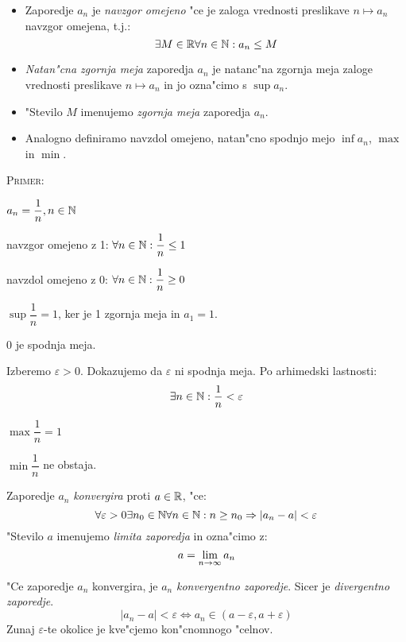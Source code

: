 \begin{itemize}
	\item Zaporedje $a_n$ je \emph{navzgor omejeno} "ce je zaloga vrednosti preslikave $n \mapsto a_n$ navzgor omejena, t.j.:
	\begin{equation*}
	\exists M \in \mathbb{R} \forall n \in \mathbb{N}: a_n \leq M
	\end{equation*}
	
	\item \emph{Natan"cna zgornja meja} zaporedja $a_n$ je natanc"na zgornja meja zaloge vrednosti preslikave $n \mapsto a_n$ in jo ozna"cimo s $\sup a_n$.
	
	\item "Stevilo $M$ imenujemo \emph{zgornja meja} zaporedja $a_n$.
	
	\item Analogno definiramo navzdol omejeno, natan"cno spodnjo mejo $\inf a_n$, $\max$ in $\min$.
\end{itemize}

\textsc{Primer:}

$a_n = \dfrac{1}{n}, n \in \mathbb{N}$
	
navzgor omejeno z 1: $\forall n \in \mathbb{N}: \dfrac{1}{n} \leq 1$
	
navzdol omejeno z 0: $\forall n \in \mathbb{N}: \dfrac{1}{n} \geq 0$
	
$\sup \dfrac{1}{n} = 1$, ker je 1 zgornja meja in $a_1 = 1$.
	
0 je spodnja meja.

Izberemo $\varepsilon > 0$. Dokazujemo da $\varepsilon$ ni spodnja meja. Po arhimedski lastnosti:
\begin{equation*}
\exists n \in \mathbb{N}: \dfrac{1}{n} < \varepsilon
\end{equation*}
	
$\max \dfrac{1}{n} = 1$
	
$\min \dfrac{1}{n}$ ne obstaja.

 Zaporedje $a_n$ \emph{konvergira} proti $a \in \mathbb{R}$, "ce:
\begin{equation*}
\forall \varepsilon > 0 \exists n_0 \in \mathbb{N} \forall n \in \mathbb{N}: n \geq n_0 \Rightarrow |a_n - a| < \varepsilon
\end{equation*}
"Stevilo $a$ imenujemo \emph{limita zaporedja} in ozna"cimo z:
\begin{equation*}
a = \lim_{n \rightarrow \infty} a_n
\end{equation*}

"Ce zaporedje $a_n$ konvergira, je $a_n$ \emph{konvergentno zaporedje}. Sicer je \emph{divergentno zaporedje}.
\begin{equation*}
|a_n - a| < \varepsilon \iff a_n \in (a - \varepsilon, a + \varepsilon)
\end{equation*}
Zunaj $\varepsilon$-te okolice je kve"cjemo kon"cnomnogo "celnov.

